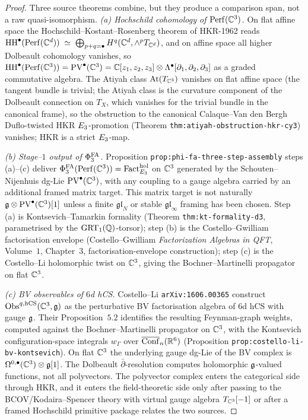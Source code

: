 \begin{proof}
Three source theorems combine, but they produce a comparison span, not
a raw quasi-isomorphism.
\emph{(a) Hochschild cohomology of $\mathrm{Perf}(\mathbb C^3)$.} On flat affine space
the Hochschild--Kostant--Rosenberg theorem of HKR-1962 reads
$\mathrm{HH}^\bullet(\mathrm{Perf}(\mathbb C^d)) \;\simeq\; \bigoplus_{p+q=\bullet}
H^q(\mathbb C^d, \wedge^p T_{\mathbb C^d})$, and on affine space all higher Dolbeault
cohomology vanishes, so $\mathrm{HH}^\bullet(\mathrm{Perf}(\mathbb C^3)) =
\mathrm{PV}^\bullet(\mathbb C^3) = \mathbb C[z_1, z_2, z_3] \otimes \Lambda^\bullet[\partial_1,
\partial_2, \partial_3]$ as a graded commutative algebra.
The Atiyah class $\mathrm{At}(T_{\mathbb C^3})$ vanishes on flat affine space
(the tangent bundle is trivial; the Atiyah class is the curvature
component of the Dolbeault connection on $T_X$, which vanishes for the
trivial bundle in the canonical frame), so the obstruction to the
canonical Calaque--Van den Bergh Duflo-twisted HKR
$E_3$-promotion (Theorem \texttt{thm:atiyah-obstruction-hkr-cy3})
vanishes; HKR is a strict $E_3$-map.

\emph{(b) Stage--$1$ output of $\Phi^{\mathrm{FA}}_3$.}
Proposition \texttt{prop:phi-fa-three-step-assembly} steps (a)--(c)
deliver $\Phi^{\mathrm{FA}}_3(\mathrm{Perf}(\mathbb C^3)) = \mathrm{Fact}_{E_3}^{\mathrm{hol}}$ on
$\mathbb C^3$ generated by the Schouten--Nijenhuis dg-Lie $\mathrm{PV}^\bullet(\mathbb C^3)$,
with any coupling to a gauge algebra carried by an additional framed
matrix target. This matrix target is not naturally
$\mathfrak g\otimes\mathrm{PV}^\bullet(\mathbb C^3)[1]$ unless a finite
$\mathfrak{gl}_N$ or stable $\mathfrak{gl}_\infty$ framing has been
chosen. Step (a) is Kontsevich--Tamarkin formality (Theorem
\texttt{thm:kt-formality-d3}, parametrised by the
$\mathrm{GRT}_1(\mathbb Q)$-torsor); step (b) is the Costello--Gwilliam
factorisation envelope (Costello--Gwilliam \emph{Factorization Algebras
in QFT}, Volume~$1$, Chapter~$3$, factorisation-envelope construction);
step (c) is the Costello--Li holomorphic twist on $\mathbb C^3$, giving the
Bochner--Martinelli propagator on flat $\mathbb C^3$.

\emph{(c) BV observables of $6$d hCS.}
Costello--Li \texttt{arXiv:1606.00365} construct
$\mathrm{Obs}^{q,\mathrm{hCS}}(\mathbb C^3, \mathfrak g)$ as the perturbative BV factorisation
algebra of $6$d hCS with gauge $\mathfrak g$. Their Proposition~$5.2$
identifies the resulting Feynman-graph weights, computed against the
Bochner--Martinelli propagator on $\mathbb C^3$, with the Kontsevich
configuration-space integrals $w_\Gamma$ over $\overline{\mathrm{Conf}}_n(\mathbb R^6)$
(Proposition \texttt{prop:costello-li-bv-kontsevich}). On flat $\mathbb C^3$
the underlying gauge dg-Lie of the BV complex is
$\Omega^{0,\bullet}(\mathbb C^3) \otimes \mathfrak g[1]$. The Dolbeault
$\bar\partial$-resolution computes holomorphic $\mathfrak g$-valued
functions, not all polyvectors. The polyvector complex enters the
categorical side through HKR, and it enters the field-theoretic side
only after passing to the BCOV/Kodaira--Spencer theory with virtual
gauge algebra $T_{\mathbb C^3}[-1]$ or after a framed Hochschild primitive
package relates the two sources.


\end{proof}
